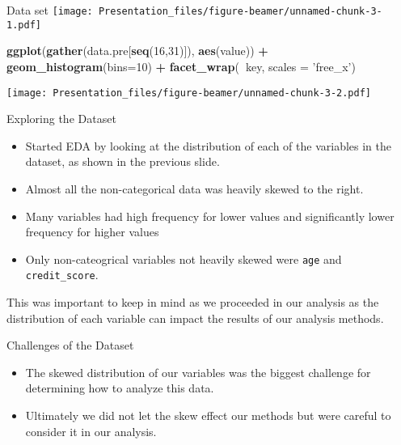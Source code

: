 \documentclass[ignorenonframetext,]{beamer}
\newenvironment{Shaded}{\begin{snugshade}}{\end{snugshade}}
\newcommand{\KeywordTok}[1]{\textcolor[rgb]{0.13,0.29,0.53}{\textbf{#1}}}
\newcommand{\DataTypeTok}[1]{\textcolor[rgb]{0.13,0.29,0.53}{#1}}
\newcommand{\DecValTok}[1]{\textcolor[rgb]{0.00,0.00,0.81}{#1}}
\newcommand{\StringTok}[1]{\textcolor[rgb]{0.31,0.60,0.02}{#1}}
\newcommand{\OperatorTok}[1]{\textcolor[rgb]{0.81,0.36,0.00}{\textbf{#1}}}
\newcommand{\NormalTok}[1]{#1}
\providecommand{\tightlist}{%
  \setlength{\itemsep}{0pt}\setlength{\parskip}{0pt}}
\begin{document}
\begin{frame}[fragile]{Data set}
\texttt{[image: Presentation\_files/figure-beamer/unnamed-chunk-3-1.pdf]}

\begin{Shaded}
\begin{Highlighting}[]
\KeywordTok{ggplot}\NormalTok{(}\KeywordTok{gather}\NormalTok{(data.pre[}\KeywordTok{seq}\NormalTok{(}\DecValTok{16}\NormalTok{,}\DecValTok{31}\NormalTok{)]), }\KeywordTok{aes}\NormalTok{(value)) }\OperatorTok{+}\StringTok{ }
\StringTok{    }\KeywordTok{geom_histogram}\NormalTok{(}\DataTypeTok{bins=}\DecValTok{10}\NormalTok{) }\OperatorTok{+}\StringTok{ }
\StringTok{    }\KeywordTok{facet_wrap}\NormalTok{(}\OperatorTok{~}\NormalTok{key, }\DataTypeTok{scales =} \StringTok{'free_x'}\NormalTok{)}
\end{Highlighting}
\end{Shaded}

\texttt{[image: Presentation\_files/figure-beamer/unnamed-chunk-3-2.pdf]}

\end{frame}

\begin{frame}[fragile]{Exploring the Dataset}

\begin{itemize}
\tightlist
\item
  Started EDA by looking at the distribution of each of the variables in
  the dataset, as shown in the previous slide.
\item
  Almost all the non-categorical data was heavily skewed to the right.
\item
  Many variables had high frequency for lower values and significantly
  lower frequency for higher values
\item
  Only non-cateogrical variables not heavily skewed were \texttt{age}
  and \texttt{credit\_score}.
\end{itemize}

This was important to keep in mind as we proceeded in our analysis as
the distribution of each variable can impact the results of our analysis
methods.

\end{frame}

\begin{frame}{Challenges of the Dataset}

\begin{itemize}
\tightlist
\item
  The skewed distribution of our variables was the biggest challenge for
  determining how to analyze this data.
\item
  Ultimately we did not let the skew effect our methods but were careful
  to consider it in our analysis.
\end{itemize}

\end{frame}
\end{document}
